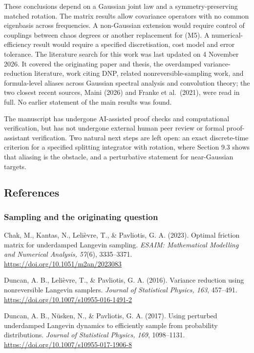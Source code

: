 \documentclass[
  british,
  11pt,
  a4paper,
]{article}
\begin{document}
These conclusions depend on a Gaussian joint law and a
symmetry-preserving matched rotation. The matrix results allow
covariance operators with no common eigenbasis across frequencies. A
non-Gaussian extension would require control of couplings between chaos
degrees or another replacement for (M5). A numerical-efficiency result
would require a specified discretisation, cost model and error
tolerance. The literature search for this work was last updated on 4
November 2026. It covered the originating paper and thesis, the
overdamped variance-reduction literature, work citing DNP, related
nonreversible-sampling work, and formula-level aliases across Gaussian
spectral analysis and convolution theory; the two closest recent
sources, Maini (2026) and Franke et al.~(2021), were read in full. No
earlier statement of the main results was found.

The manuscript has undergone AI-assisted proof checks and computational
verification, but has not undergone external human peer review or formal
proof-assistant verification. Two natural next steps are left open: an
exact discrete-time criterion for a specified splitting integrator with
rotation, where Section 9.3 shows that aliasing is the obstacle, and a
perturbative statement for near-Gaussian targets.

\subsection{References}\label{references}

\subsubsection{Sampling and the originating
question}\label{sampling-and-the-originating-question}

Chak, M., Kantas, N., Lelièvre, T., \& Pavliotis, G. A. (2023). Optimal
friction matrix for underdamped Langevin sampling. \emph{ESAIM:
Mathematical Modelling and Numerical Analysis, 57}(6), 3335--3371.
\url{https://doi.org/10.1051/m2an/2023083}

Duncan, A. B., Lelièvre, T., \& Pavliotis, G. A. (2016). Variance
reduction using nonreversible Langevin samplers. \emph{Journal of
Statistical Physics, 163}, 457--491.
\url{https://doi.org/10.1007/s10955-016-1491-2}

Duncan, A. B., Nüsken, N., \& Pavliotis, G. A. (2017). Using perturbed
underdamped Langevin dynamics to efficiently sample from probability
distributions. \emph{Journal of Statistical Physics, 169}, 1098--1131.
\url{https://doi.org/10.1007/s10955-017-1906-8}
\end{document}
